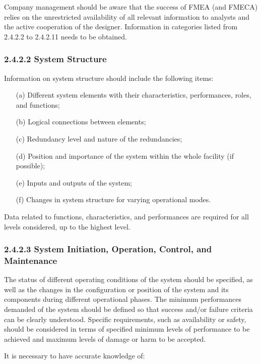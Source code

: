 \documentclass[./dissertation.tex]{subfiles}
\begin{document}
Company management should be aware that the success of FMEA (and FMECA) relies on the unrestricted availability of all relevant information to analysts and the active cooperation of the designer. Information in categories listed from 2.4.2.2 to 2.4.2.11 needs to be obtained.

\subsubsection{2.4.2.2 System Structure}

Information on system structure should include the following items:

\begin{enumerate}
\item[(a)] Different system elements with their characteristics, performances, roles, and functions;
\item[(b)] Logical connections between elements;
\item[(c)] Redundancy level and nature of the redundancies;
\item[(d)] Position and importance of the system within the whole facility (if possible);
\item[(e)] Inputs and outputs of the system;
\item[(f)] Changes in system structure for varying operational modes.
\end{enumerate}

Data related to functions, characteristics, and performances are required for all levels considered, up to the highest level.

\subsubsection{2.4.2.3 System Initiation, Operation, Control, and Maintenance}

The status of different operating conditions of the system should be specified, as well as the changes in the configuration or position of the system and its components during different operational phases. The minimum performances demanded of the system should be defined so that success and/or failure criteria can be clearly understood. Specific requirements, such as availability or safety, should be considered in terms of specified minimum levels of performance to be achieved and maximum levels of damage or harm to be accepted.

It is necessary to have accurate knowledge of:
\end{document}
